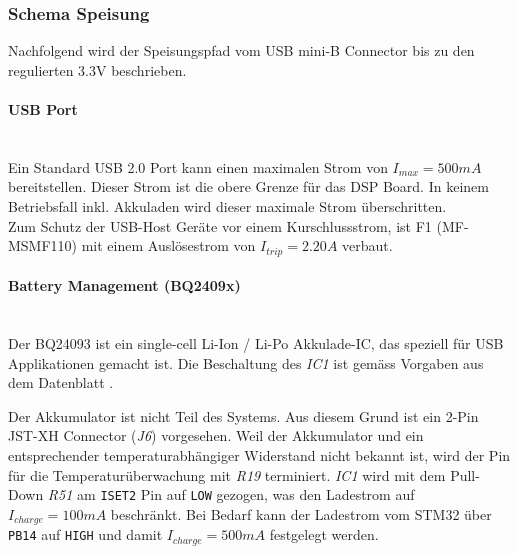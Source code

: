 \subsubsection{Schema Speisung}
\label{sec:Schema_Speisung}

Nachfolgend wird der Speisungspfad vom USB mini-B Connector bis zu den regulierten 3.3\si{V} beschrieben.

\paragraph{USB Port}\vspace{-0.3cm}\\
Ein Standard USB 2.0 Port kann einen maximalen Strom von ${I_{max}=500\si{mA}}$ bereitstellen. Dieser Strom ist die obere Grenze für das DSP Board. In keinem Betriebsfall inkl. Akkuladen wird dieser maximale Strom überschritten. \\
Zum Schutz der USB-Host Geräte vor einem Kurschlussstrom, ist F1 (MF-MSMF110) mit einem Auslösestrom von ${I_{trip}=2.20\si{A}}$ \cite{usb-fuse} verbaut.


\paragraph{Battery Management (BQ2409x)}\vspace{-0.3cm}\\
Der BQ24093 ist ein single-cell Li-Ion / Li-Po Akkulade-IC, das speziell für USB Applikationen gemacht ist.
Die Beschaltung des \textit{IC1} ist gemäss Vorgaben aus dem Datenblatt \cite{bq2409x}.

Der Akkumulator ist nicht Teil des Systems. Aus diesem Grund ist ein 2-Pin JST-XH Connector (\textit{J6}) vorgesehen.
Weil der Akkumulator und ein entsprechender temperaturabhängiger Widerstand nicht bekannt ist, 
wird der Pin für die Temperaturüberwachung mit \textit{R19} terminiert.
\textit{IC1} wird mit dem Pull-Down \textit{R51} am \texttt{ISET2} Pin auf \texttt{LOW} gezogen, was den Ladestrom auf ${I_{charge}=100\si{mA}}$ beschränkt. 
Bei Bedarf kann der Ladestrom vom STM32 über \texttt{PB14} auf \texttt{HIGH} und damit ${I_{charge}=500\si{mA}}$ festgelegt werden.


